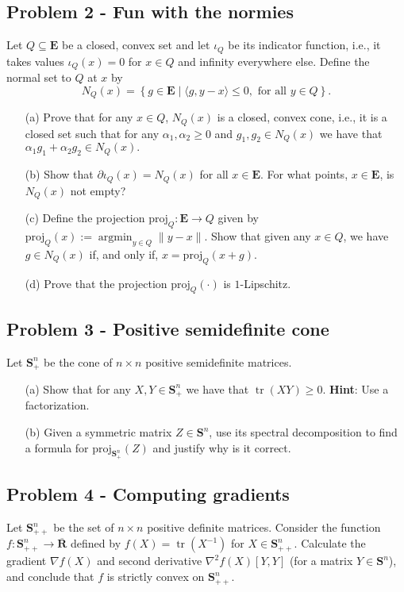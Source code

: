 \documentclass[11pt]{article}
\newcommand{\E}{\mathbf{E}}
\newcommand{\Spp}{\mathbf{S}_{++}^n}
\newcommand{\Sp}{\mathbf{S}_{+}^n}
\newcommand{\SSS}{\mathbf{S}^n}
\newcommand{\bR}{\overline{\mathbf{R}}}
\newcommand{\Tr}{\operatorname{tr}}
\begin{document}
\subsection*{Problem 2 - Fun with the normies}
\label{sec:org4deb351}
Let \(Q \subseteq \E\) be a closed, convex set and let \(\iota_{Q}\) be its indicator function, i.e., it takes values \(\iota_{Q}(x) = 0\) for \(x \in Q\) and infinity everywhere else. Define the normal set to \(Q\) at \(x\) by
$$
N_{Q}(x) = \left\{g \in \E \mid \langle g, y - x\rangle \leq 0, \text{ for all } y \in Q\right\}.
$$
\begin{enumerate}
\item[(a)] Prove that for any $x\in Q$, $N_{Q}(x)$ is a closed, convex cone, i.e., it is a closed set such that for any $\alpha_{1}, \alpha_{2} \geq 0$ and $g_{1}, g_{2} \in N_{Q}(x)$ we have that $\alpha_{1} g_{1} + \alpha_{2} g_{2} \in N_{Q}(x).$
\item[(b)] Show that $\partial \iota_{Q}(x) = N_{Q}(x)$ for all $x \in \E$. For what points, $x \in \E$, is $N_{Q}(x)$ not empty?
\item[(c)] Define the projection $\textrm{proj}_{Q} \colon \E \rightarrow Q$ given by $\textrm{proj}_{Q}(x) := \operatorname{argmin}_{y \in Q} \|y - x\|$.  Show that given any $x \in Q$, we have $g \in N_{Q}(x)$ if, and only if, $x = \textrm{proj}_{Q}(x + g).$
\item[(d)] Prove that the projection $\textrm{proj}_{Q}(\cdot)$ is $1$-Lipschitz.
\end{enumerate}
\subsection*{Problem 3 - Positive semidefinite cone}
\label{sec:org3352437}

Let \(\Sp\) be the cone of \(n \times n\) positive semidefinite matrices.

\begin{enumerate}
\item[(a)] Show that for any $X, Y \in \Sp$ we have that $\Tr(XY) \geq 0$. \textbf{Hint}: Use a factorization.
\item[(b)] Given a symmetric matrix $Z \in \SSS$, use its spectral decomposition to find a formula for $\text{proj}_{\Sp}(Z)$ and justify why is it correct.
\end{enumerate}
\subsection*{Problem 4 - Computing gradients}
\label{sec:org868428c}
Let \(\Spp\) be the set of \(n\times n\) positive definite matrices. Consider the function \(f \colon \Spp \rightarrow \bR\) defined by \(f(X) = \Tr(X^{-1})\) for \(X \in \Spp\). Calculate the gradient \(\nabla f(X)\) and second derivative \(\nabla^2 f(X)[Y, Y]\) (for a matrix \(Y \in \SSS\)), and conclude that \(f\) is strictly convex on \(\Spp\).
\end{document}

